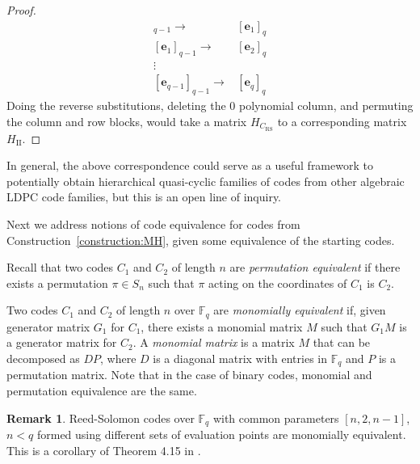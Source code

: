 \documentclass[11pt]{amsart}
\theoremstyle{definition}
\newtheorem{remark}[theorem]{Remark}
\newcommand{\0}{\mathbf{0}}
\newcommand{\F}{\mathbb{F}}
\begin{document}
\begin{proof}
\begin{align*}
    [\textbf{0}]_{q-1}\to &[\textbf{e}_1]_q \\
    [\textbf{e}_1]_{q-1} \to & [\textbf{e}_2]_q\\
    \vdots & \\ 
    [\textbf{e}_{q-1}]_{q-1} \to & [\textbf{e}_q]_q
\end{align*}
Doing the reverse substitutions, deleting the $0$ polynomial column, and permuting the column and row blocks, would take a matrix $H_{C_{\text{RS}}}$ to a corresponding matrix $H_{\text{II}}$. 
\end{proof}

In general, the above correspondence could serve as a useful framework to potentially obtain hierarchical quasi-cyclic families of codes from other algebraic LDPC code families, but this is an open line of inquiry.



Next we address notions of code equivalence for codes from Construction~\ref{construction:MH}, given some equivalence of the starting codes.

Recall that two codes $C_1$ and $C_2$ of length $n$ are \textit{permutation equivalent} if there exists a permutation $\pi \in S_n$ such that $\pi$ acting on the coordinates of $C_1$ is $C_2$.

Two codes $C_1$ and $C_2$ of length $n$ over $\F_q$ are \textit{monomially equivalent} if, given generator matrix $G_1$ for $C_1$, there exists a monomial matrix $M$ such that $G_1 M$ is a generator matrix for $C_2$. A \textit{monomial matrix} is a matrix $M$ that can be decomposed as $DP$, where $D$ is a diagonal matrix with entries in $\F_q$ and $P$ is a permutation matrix. Note that in the case of binary codes, monomial and permutation equivalence are the same.


\begin{remark}\label{remark:mono}
   Reed-Solomon codes over $\F_q$ with common parameters $[n, 2, n-1]$, $n< q$ formed using different sets of evaluation points are monomially equivalent.
   This is a corollary of Theorem 4.15 in \cite{cabana2022cyclic}.
\end{remark}
\end{document}
